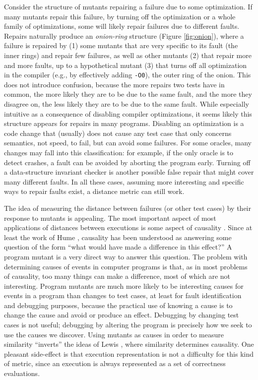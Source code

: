 Consider the structure of mutants repairing a failure due to some optimization.  If many mutants repair this failure, by turning off the optimization or a whole family of optimizations, some will likely repair failures due to different faults.  Repairs naturally produce an \emph{onion-ring} structure (Figure \ref{fig:onion}), where a failure is repaired by (1) some mutants that are very specific to its fault (the inner rings) and repair few failures, as well as other mutants (2) that repair more and more faults, up to a hypothetical mutant (3) that turns off all optimization in the compiler (e.g., by effectively adding {\tt -O0}), the outer ring of the onion.  This does not introduce confusion, because the more repairs two tests have in common, the more likely they are to be due to the same fault, and the more they disagree on, the less likely they are to be due to the same fault.  While especially intuitive as a consequence of disabling compiler optimizations, it seems likely this structure appears for repairs in many programs.  Disabling an optimization is a code change that (usually) does not cause any test case that only concerns semantics, not speed, to fail, but can avoid some failures.  For some oracles, many changes may fall into this classification:  for example, if the only oracle is to detect crashes, a fault can be avoided by aborting the program early.  Turning off a data-structure invariant checker is another possible false repair that might cover many different faults.  In all these cases, assuming more interesting and specific ways to repair faults exist, a distance metric can still work.

The idea of measuring the distance between failures (or other test cases) by their response to mutants is appealing.  The most important aspect of most applications of distances between executions is some aspect of causality \cite{LewisCause,ZellerBook}.  Since at least the work of Hume \cite{Hume1}, causality has been understood as answering some question of the form ``what would have made a difference in this effect?''  A program mutant is a very direct way to answer this question.  The problem with determining causes of events in computer programs is that, as in most problems of causality, too many things can make a difference, most of which are not interesting.  Program mutants are much more likely to be interesting causes for events in a program than changes to test cases, at least for fault identification and debugging purposes, because the practical use of knowing a cause is to change the cause and avoid or produce an effect.  Debugging by changing test cases is not useful; debugging by altering the program is precisely how we seek to use the causes we discover.  Using mutants as causes in order to measure similarity ``inverts'' the ideas of Lewis \cite{LewisCause,LewisCount}, where similarity determines causality.  One pleasant side-effect is that execution representation \cite{NearNeighbor,RepsSpectra} is not a difficulty for this kind of metric, since an execution is always represented as a set of correctness evaluations.

